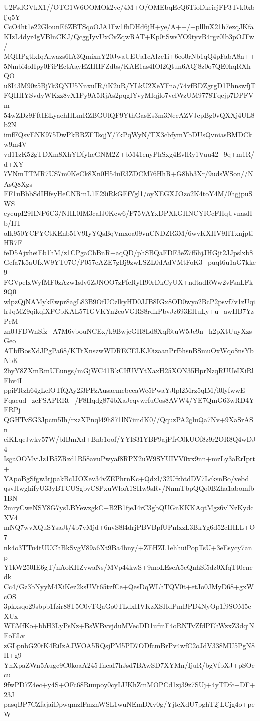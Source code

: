 U2FsdGVkX1//OTG1W6OOMOk2vc/4M+O/OMEbqEcQ6TioDkeicjFP3Tvk0xbljq5Y
CcO4ht1e22GlounE6ZBTSqoOJA1Fw1fhDHd6jH+ye/A++/+pllluX21h7ezqJKfa
KIzL4dyr4gVBlnCKJ/QcggIyvUxCvZqwRAT+Kp0tSwsYO9tyvB4rgz0lb3pOJFw/
MQHPgtlxIqAlwazs6IA3QmixnY20JwaUEUa1cAlzc1i+6eo0rNb1qQ4pFabA8n++
5Nmbi4oHpy0FiPEctAayEZHHFZdbs/KAE1as4IOl2Qtun6AQj8z0o7QE0hqRXhQO
u8I43M90z5Bj7k3QNU5NnxuIR/iK2uR/YLkU2XeYFna/74vfBDZgrgD1PhnswfjT
FQIHIYSvdyWKzz8vX1Py9A5RjAs2pqgIYvyMIqjlo7velWzUM9778Tqcjp7DPFVm
54wZDz9FftIELyaehHLmRZBGUlQF9YthGasEs3m3NecAZVJcpBg0vQXXj4UL8b2N
imfFQsvENK975DwPkBRZFTsqjY/7kPqWyN/TX3cbfymYbDUsQvniasBMDCkw9m4V
vd11zK52gTDXm8XhYDfyhcGNM2Z+bM41enyPhSxg4EvlRy1Vuu42+9q+m1R/d+XY
7VNmTTMR7US7m0KeCk8Xn0H54uE3ZDCM76HhR+G8bb3Xr/9udsWSon//NAsQ8Xgs
FF1uBbbSdIHfsyHeCNRmL1E29iRkGEfYgl1/oyXEGXJOzo2K4toY4M/0hgjpuSWS
eyeupI29HNP6C3/NHL0IM3caIJ0Kcw6/F75VAYxDPXkGHNCYICcFHqUvnasHb/HT
oIk950YCFYCtKEnb51V9IyYQsBqVmxoa09vnCNDZR3M/6wvKXHV9HTxnjptiHR7F
feD5AjxheiEb1hM/z1CPgaChBnR+aqQD/phSBQaFDF3eZ7f5hjJHGjt2JJpslxb8
Gcfa7k5aUfxW9YT07C/P057eAZE7gBj9zwLSZL0dAdVMtFoK3+puqt6u1aG7kke9
FGVpelxWyfMF0zAzw1sIv6ZJNOO7zFfcRyH90rDkCyUX+ndtadRWw2vFsnLFk9Q0
wlpzQjNAMykEwpr8agL83B9OfUCzlkyHD0JJB8IGx8OD0wyo2BcP2psvf7v1zUqi
lrJqMZ9qikqiXPCbKAL571GVKYn2coVGRS8rdkPbvJz693EHuLy+u+awHB7YzPcM
zn0JFDWnSfz+A7M6vbouNCEx/k9BwjeGH8Ld8Xqf6tuW5Je9n+h2pXtUuyXzsGeo
ATbfBosXdJPgPa68/KTtXnszwWDRECELKJ0izaanPrf5hsnBSmuOxWqo8nsYbNbK
2byY8ZXmRmUEungs/mGjWC41RkCIfUVYtXaxH25XON35HprNzqRUUeIXiRlFhv4I
ppiFRzh64gLelOTfQAy2i3PFzAusaemcbceaWe5PwaYJlpl2Mrz5qIM/i0lyfwwE
Fqacud+zeFSAPRRt+/F8Hqdg874bXaJcqvwrfuCos8AVW4/YE7QmG63wRD4YERPj
QGHTvSG3Jpcm5Ih/rxzXPnql49h871lN7imdK0//QquzPA2gluQa7Nv+9XaSrASn
ciKLqeJwkv57W/bIBmXd+Bnb1oof/YYlS31YBF9ajPfrC0kUOf8z9r2OR8Q4wDJ4
IsgaOOMviJz1B5ZRzd1R58avuPwyaf8RPX2uW9SYUIVV0xx9nn+mzLy3aRrIprt+
YApoBgSfgw3rjpakBcIJOXev34vZEPhrnKc+Qdxl/32UfzbtdDV7LcksnBo/vebd
qsvHwghifyU33yBTCUSgbvC8PxuWloA1SHw9sRv/NmnTbpQQo0BZha1abomfb1BN
2mryCweNSY8G7ysLBYewzgkC+B2B1fjeJ4rC3gbQUGnKKKAqtMgz6vlNzKydcXV4
mNQ7wvXQuSYsaJt/4b7vMjd+6nvS8l4drjPBVBpfUPnlxzL3BkYg6d52cIHLL+O7
nk4o3TTu4tUUChBkSvgV89a6Xt9Ba4bny/+ZEHZL1ehhuiPopTsU+3eEsycy7anp
Y1kW250IE6gT/nAoKHZvwaNs/MVp44kwS+9moLEseA5eQnhSf5dz0XfqTt0cncdk
Cc4/Gz3bNyyM4XiKez2ksUVt65tzfCe+QesDqWLhTQV0t+etJo0JMyD68+gxWcOS
3pkxsqo29sbpb1fzir88T5C0vTQaGo0TLdxHVKzXSHdPmBPD4NyOp1f9SOM5cXUx
WEMfKo+bbH3LyPsNz+BsWBvvjduMVecDD1ufmF4oRNTvZfdPEhWzxZ3dqiNEoELv
zGLpnbG20tK4RiIzAJWOA5RQsjPM5PD7ODfcmBrPv4wfC2oJdV338MU5PgN8H+g9
YhXpaZWn5Augc9C0koaA245TneaI7hJsd7BAwSD7XYMn/IjuR/bgVfbXJ+pSOccu
9fwPD7Z4ec+y4S+OFc68Ruupoy0cyLUKhZmMOPCd1zj39z7SUj+4yTDfc+DF+23J
pasqBP7CZfajaiDpwqmzlFmznWSL1wuNEmDXv0g/YjtcXdU7pghT2jLCjg4o+peW
